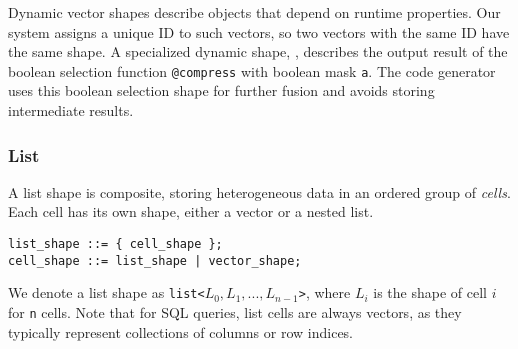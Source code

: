 Dynamic vector shapes describe objects that depend on runtime properties. Our system
assigns a unique ID to such vectors, so two vectors with the same ID have the
same shape. A specialized dynamic shape, , describes the output result
of the boolean selection function \texttt{@compress} with boolean mask \texttt{a}. The code generator uses this boolean selection shape for further fusion and
avoids storing intermediate results.

\subsubsection{List}

A list shape is composite, storing heterogeneous data in an ordered group of
\textit{cells}. Each cell has its own shape, either a vector or a nested list.
\begin{small}
\begin{verbatim}
list_shape ::= { cell_shape };
cell_shape ::= list_shape | vector_shape;
\end{verbatim}
\end{small}
We denote a list shape as \texttt{list<$L_0,L_1,...,L_{n-1}$>}, where $L_i$
is the shape of cell $i$ for \texttt{n} cells. Note that for SQL queries,
list cells are always vectors, as they typically represent collections of columns
or row indices.




